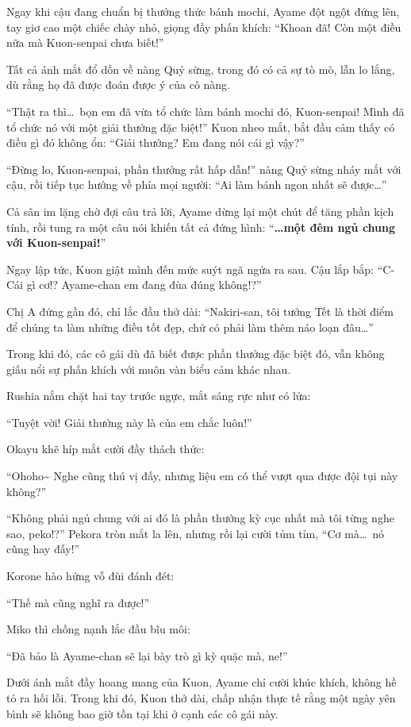 \documentclass[../main.tex]{subfiles}
\begin{document}
Ngay khi cậu đang chuẩn bị thưởng thức bánh mochi, Ayame đột ngột đứng lên, tay giơ cao một chiếc chày nhỏ, giọng đầy phấn khích: ``Khoan đã! Còn một điều nữa mà Kuon-senpai chưa biết!''

Tất cả ánh mắt đổ dồn về nàng Quỷ sừng, trong đó có cả sự tò mò, lẫn lo lắng, dù rằng họ đã được đoán được ý của cô nàng.

``Thật ra thì\dots\ bọn em đã vừa tổ chức làm bánh mochi đó, Kuon-senpai! Mình đã tổ chức nó với một giải thưởng đặc biệt!'' Kuon nheo mắt, bắt đầu cảm thấy có điều gì đó không ổn: ``Giải thưởng? Em đang nói cái gì vậy?''

``Đừng lo, Kuon-senpai, phần thưởng rất hấp dẫn!'' nàng Quỷ sừng nháy mắt với cậu, rồi tiếp tục hướng về phía mọi người: ``Ai làm bánh ngon nhất sẽ được\dots''

Cả sân im lặng chờ đợi câu trả lời, Ayame dừng lại một chút để tăng phần kịch tính, rồi tung ra một câu nói khiến tất cả đứng hình: ``\textbf{\dots một đêm ngủ chung với Kuon-senpai!}''

Ngay lập tức, Kuon giật mình đến mức suýt ngã ngửa ra sau. Cậu lắp bắp: ``C-Cái gì cơ!? Ayame-chan em đang đùa đúng không!?''

Chị A đứng gần đó, chỉ lắc đầu thở dài: ``Nakiri-san, tôi tưởng Tết là thời điểm để chúng ta làm những điều tốt đẹp, chứ có phải làm thêm náo loạn đâu\dots''

Trong khi đó, các cô gái dù đã biết được phần thưởng đặc biệt đó, vẫn không giấu nổi sự phấn khích với muôn vàn biểu cảm khác nhau.

Rushia nắm chặt hai tay trước ngực, mắt sáng rực như có lửa:

``Tuyệt vời! Giải thưởng này là của em chắc luôn!''

Okayu khẽ híp mắt cười đầy thách thức:

``Ohoho\~{} Nghe cũng thú vị đấy, nhưng liệu em có thể vượt qua được đội tụi này không?''

``Không phải ngủ chung với ai đó là phần thưởng kỳ cục nhất mà tôi từng nghe sao, peko!?'' Pekora tròn mắt la lên, nhưng rồi lại cười tủm tỉm, ``Cơ mà\dots\ nó cũng hay đấy!''

Korone hào hứng vỗ đùi đánh đét:

``Thế mà cũng nghĩ ra được!''

Miko thì chống nạnh lắc đầu bĩu môi:

``Đã bảo là Ayame-chan sẽ lại bày trò gì kỳ quặc mà, ne!''

Dưới ánh mắt đầy hoang mang của Kuon, Ayame chỉ cười khúc khích, không hề tỏ ra hối lỗi. Trong khi đó, Kuon thở dài, chấp nhận thực tế rằng một ngày yên bình sẽ không bao giờ tồn tại khi ở cạnh các cô gái này.
\end{document}
